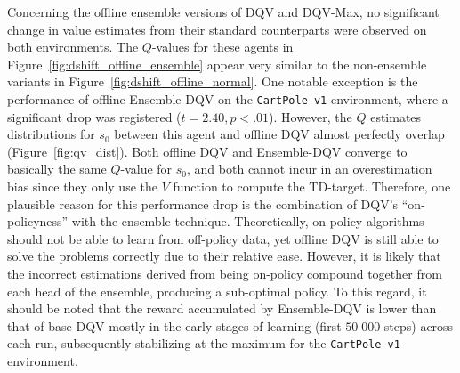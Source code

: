 Concerning the offline ensemble versions of DQV and DQV-Max, no
significant change in value estimates from their standard counterparts
were observed on both environments. The $Q$-values for these agents in
Figure~\ref{fig:dshift_offline_ensemble} appear very similar to the
non-ensemble variants in Figure~\ref{fig:dshift_offline_normal}. One
notable exception is the performance of offline Ensemble-DQV on the
\texttt{CartPole-v1} environment, where a significant drop was
registered ($t=2.40,p<.01$). However, the $Q$ estimates distributions
for $s_0$ between this agent and offline DQV almost perfectly
overlap (Figure~\ref{fig:qv_dist}). Both offline
DQV and Ensemble-DQV converge to basically the same $Q$-value for
$s_0$, and both cannot incur in an overestimation bias since they only
use the $V$ function to compute the TD-target. Therefore, one
plausible reason for this performance drop is the combination of DQV's
``on-policyness'' with the ensemble technique. Theoretically,
on-policy algorithms should not be able to learn from off-policy data,
yet offline DQV is still able to solve the problems correctly due to
their relative ease. However, it is likely that the incorrect
estimations derived from being on-policy compound together from each
head of the ensemble, producing a sub-optimal policy. To this regard,
it should be noted that the reward accumulated by Ensemble-DQV is
lower than that of base DQV mostly in the early stages of learning
(first $50 \; 000$ steps) across each run, subsequently stabilizing at
the
maximum for the \texttt{CartPole-v1} environment.

